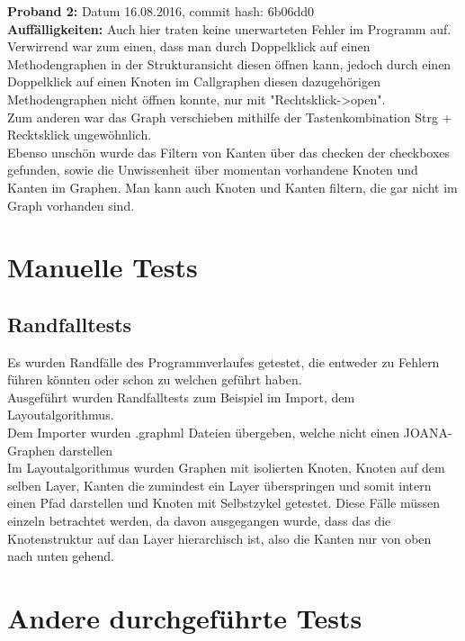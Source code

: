 \textbf{Proband 2:} Datum 16.08.2016, commit hash: 6b06dd0\\
\textbf{Auffälligkeiten: } Auch hier traten keine unerwarteten Fehler im Programm auf.\\
Verwirrend war zum einen, dass man durch Doppelklick auf einen Methodengraphen in der Strukturansicht diesen öffnen kann, jedoch durch einen Doppelklick auf einen Knoten im Callgraphen diesen dazugehörigen Methodengraphen nicht öffnen konnte, nur mit "Rechtsklick->open".\\
Zum anderen war das Graph verschieben mithilfe der Tastenkombination Strg + Recktsklick ungewöhnlich.\\
Ebenso unschön wurde das Filtern von Kanten über das checken der checkboxes gefunden, sowie die Unwissenheit über momentan vorhandene Knoten und Kanten im Graphen. Man kann auch Knoten und Kanten filtern, die gar nicht im Graph vorhanden sind.\\




\section{Manuelle Tests}

\subsection{Randfalltests}
Es wurden Randfälle des Programmverlaufes getestet, die entweder zu Fehlern führen könnten oder schon zu welchen geführt haben.\\
Ausgeführt wurden Randfalltests zum Beispiel im Import, dem Layoutalgorithmus.\\
Dem Importer wurden .graphml Dateien übergeben, welche nicht einen JOANA-Graphen darstellen\\
Im Layoutalgorithmus wurden Graphen mit isolierten Knoten, Knoten auf dem selben Layer, Kanten die zumindest ein Layer überspringen und somit intern einen Pfad darstellen und Knoten mit Selbstzykel getestet. Diese Fälle müssen einzeln betrachtet werden, da davon ausgegangen wurde, dass das die Knotenstruktur auf dan Layer hierarchisch ist, also die Kanten nur von oben nach unten gehend.\\


\section{Andere durchgeführte Tests}
